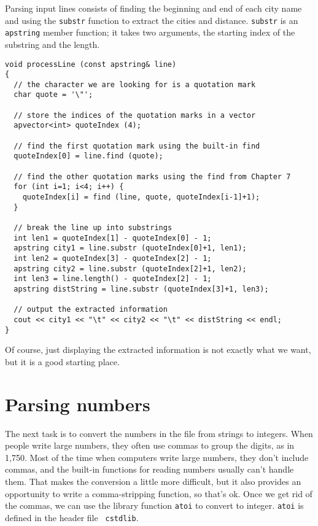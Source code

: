 
Parsing input lines consists of finding the beginning and
end of each city name and using
the {\tt substr} function to extract the cities and distance.
{\tt substr} is an {\tt apstring} member function;
it takes two arguments, the starting index of the substring
and the length.


\begin{verbatim}
void processLine (const apstring& line)
{
  // the character we are looking for is a quotation mark
  char quote = '\"';

  // store the indices of the quotation marks in a vector
  apvector<int> quoteIndex (4);

  // find the first quotation mark using the built-in find
  quoteIndex[0] = line.find (quote);

  // find the other quotation marks using the find from Chapter 7
  for (int i=1; i<4; i++) {
    quoteIndex[i] = find (line, quote, quoteIndex[i-1]+1);
  }

  // break the line up into substrings
  int len1 = quoteIndex[1] - quoteIndex[0] - 1;
  apstring city1 = line.substr (quoteIndex[0]+1, len1);
  int len2 = quoteIndex[3] - quoteIndex[2] - 1;
  apstring city2 = line.substr (quoteIndex[2]+1, len2);
  int len3 = line.length() - quoteIndex[2] - 1;
  apstring distString = line.substr (quoteIndex[3]+1, len3);

  // output the extracted information
  cout << city1 << "\t" << city2 << "\t" << distString << endl;
}
\end{verbatim}
%
Of course, just displaying the extracted information is not
exactly what we want, but it is a good starting place.

\section{Parsing numbers}

The next task is to convert the numbers in the file from strings to
integers.  When people write large numbers, they often use commas to
group the digits, as in 1,750.  Most of the time when computers write
large numbers, they don't include commas, and the built-in functions
for reading numbers usually can't handle them.  That makes the
conversion a little more difficult, but it also provides an
opportunity to write a comma-stripping function, so that's ok.  Once
we get rid of the commas, we can use the library function {\tt atoi}
to convert to integer.  {\tt atoi} is defined in the header file {\tt
cstdlib}.

